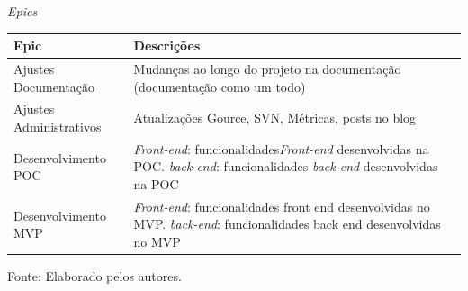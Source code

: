 \documentclass[
    12pt,               %
    openright,          %
    oneside,
    a4paper,            %
    BIBLATEX,           %
    TODO,               %
    english,            %
    brazil              %
    ]{ifsp-spo-inf-ctds}
\begin{document}
    
 \begin{center}
      \begin{quadro}[H]
      \centering
          \caption{\emph{Epics}}
          \begin{tabulary}{1.0\textwidth}{|p{12em}|p{25em}|}
        \hline
       Epic & Descrições  \\
        \hline
        Ajustes Documentação & Mudanças ao longo do projeto na documentação (documentação como um todo)\\
        \hline
        Ajustes Administrativos & Atualizações Gource, SVN, Métricas, posts no blog\\
        \hline
        Desenvolvimento POC &\emph{Front-end}: funcionalidades\emph{Front-end} desenvolvidas na POC.
        \emph{back-end}: funcionalidades \emph{back-end} desenvolvidas na POC\\
        \hline
        Desenvolvimento MVP &\emph{Front-end}: funcionalidades front end desenvolvidas no MVP.
      \emph{back-end}: funcionalidades back end desenvolvidas no MVP\\
        \hline
        \end{tabulary}
          \label{qd: epic}
          \centering
         { \footnotesize Fonte: Elaborado pelos autores.}
      \end{quadro}
    \end{center} 
\end{document}
